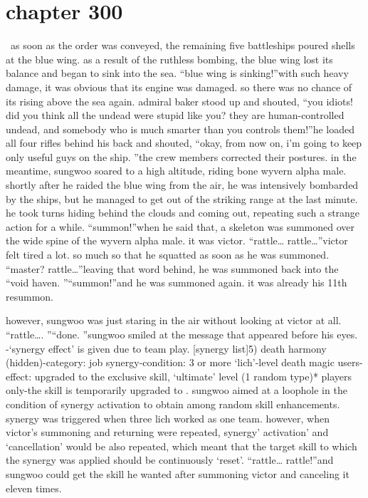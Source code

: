 \section{chapter 300}






 as soon as the order was conveyed, the remaining five battleships poured shells at the blue wing.
 as a result of the ruthless bombing, the blue wing lost its balance and began to sink into the sea.
“blue wing is sinking!”with such heavy damage, it was obvious that its engine was damaged.
 so there was no chance of its rising above the sea again.
admiral baker stood up and shouted, “you idiots! did you think all the undead were stupid like you? they are human-controlled undead, and somebody who is much smarter than you controls them!”he loaded all four rifles behind his back and shouted, “okay, from now on, i’m going to keep only useful guys on the ship.
”the crew members corrected their postures.
in the meantime, sungwoo soared to a high altitude, riding bone wyvern alpha male.
 shortly after he raided the blue wing from the air, he was intensively bombarded by the ships, but he managed to get out of the striking range at the last minute.
he took turns hiding behind the clouds and coming out, repeating such a strange action for a while.
“summon!”when he said that, a skeleton was summoned over the wide spine of the wyvern alpha male.
 it was victor.
“rattle… rattle…”victor felt tired a lot.
 so much so that he squatted as soon as he was summoned.
“master? rattle…”leaving that word behind, he was summoned back into the “void haven.
”“summon!”and he was summoned again.
 it was already his 11th resummon.

however, sungwoo was just staring in the air without looking at victor at all.
“rattle….
”“done.
”sungwoo smiled at the message that appeared before his eyes.
-‘synergy effect’ is given due to team play.
[synergy list]5) death harmony (hidden)-category: job synergy-condition: 3 or more ‘lich’-level death magic users-effect: upgraded to the exclusive skill, ‘ultimate’ level (1 random type)* players only-the skill  is temporarily upgraded to .
sungwoo aimed at a loophole in the condition of synergy activation to obtain  among random skill enhancements.
 synergy was triggered when three lich worked as one team.
however, when victor’s summoning and returning were repeated, synergy’ activation’ and ‘cancellation’ would be also repeated, which meant that the target skill to which the synergy was applied should be continuously ‘reset’.
“rattle… rattle!”and sungwoo could get the skill he wanted after summoning victor and canceling it eleven times.

